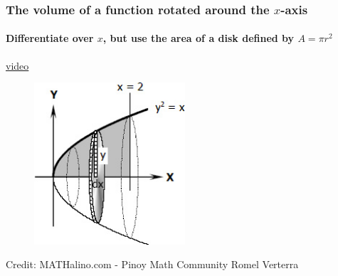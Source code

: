 \documentclass{beamer}
\begin{document}
  \frame
  {
    \frametitle{The volume of a function rotated around the $x$-axis}
    \framesubtitle{Differentiate over $x$, but use the area of a disk defined by $A=\pi r^2$}
  \href{https://www.youtube.com/watch?v=i4L5XoUBD_Q}{video}\\
  \begin{figure}[!ht]
      \centering
      \includegraphics[width=0.5\textwidth]{0413CW-paraboloid.jpg}
  \end{figure}
  \small{Credit: MATHalino.com - Pinoy Math Community Romel Verterra}
  }
\end{document}
